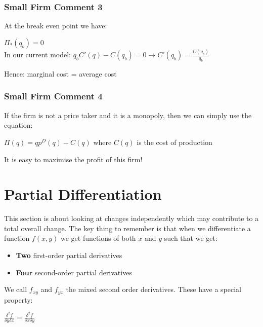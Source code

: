 \documentclass[12pt, letterpaper]{article}
\begin{document}
\subsubsection{Small Firm Comment 3}
At the break even point we have:
\begin{center}
	$\Pi_*(q_b)=0$\\
	In our current model: $q_bC'(q)-C(q_b)=0 \rightarrow C'(q_b)=\frac{C(q_b)}{q_b}$
\end{center}
Hence: marginal cost = average cost

\subsubsection{Small Firm Comment 4}
If the firm is not a price taker and it is a monopoly, then we can simply use the equation:
\begin{center}
	$\Pi(q) = qp^D(q)-C(q)$ where $C(q)$ is the cost of production
\end{center}
It is easy to maximise the profit of this firm!

\section{Partial Differentiation}
This section is about looking at changes independently which may contribute to a total overall change. The key thing to remember is that when we differentiate a function $f(x,y)$ we get functions of both $x$ and $y$ such that we get:
\begin{itemize}
	\item \textbf{Two} first-order partial derivatives
	\item \textbf{Four} second-order partial derivatives
\end{itemize}
We call $f_{xy}$ and $f_{yx}$ the mixed second order derivatives. These have a special property:
\begin{center}
	\Large{$\frac{\delta^2 f}{\delta y \delta x} = \frac{\delta^2f}{\delta x \delta y}$}
\end{center}
\end{document}
